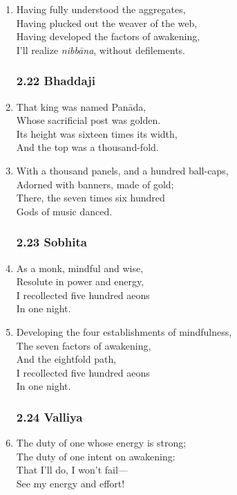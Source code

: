 \documentclass[10pt, openany]{book}
\begin{document}
\begin{enumerate}
\item Having fully understood the aggregates,\\
Having plucked out the weaver of the web,\\
Having developed the factors of awakening,\\
I’ll realize \emph{nibbāna}, without defilements.

\subsubsection*{2.22 Bhaddaji}

\item That king was named Panāda,\\
Whose sacrificial post was golden.\\
Its height was sixteen times its width,\\
And the top was a thousand-fold.

\item With a thousand panels, and a hundred ball-caps,\\
Adorned with banners, made of gold;\\
There, the seven times six hundred\\
Gods of music danced.

\subsubsection*{2.23 Sobhita}

\item As a monk, mindful and wise,\\
Resolute in power and energy,\\
I recollected five hundred aeons\\
In one night.

\item Developing the four establishments of mindfulness,\\
The seven factors of awakening, \\
And the eightfold path,\\
I recollected five hundred aeons\\
In one night.

\subsubsection*{2.24 Valliya}

\item The duty of one whose energy is strong;\\
The duty of one intent on awakening:\\
That I’ll do, I won’t fail—\\
See my energy and effort!


\end{enumerate}
\end{document}
